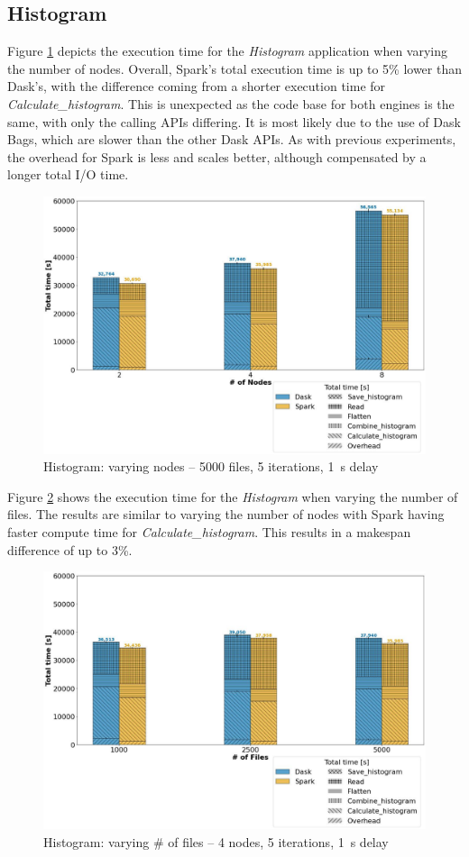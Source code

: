 \documentclass[AMA,STIX1COL]{WileyNJD-v2}
\begin{document}
\subsection{Histogram}
Figure \ref{fig:histogram_worker} depicts the execution time for the \textit{Histogram} application when varying the number of nodes.
Overall, Spark's total execution time is up to 5\% lower than Dask's, with the difference coming from a shorter execution time for \textit{Calculate\_histogram}.
This is unexpected as the code base for both engines is the same, with only the calling APIs differing.
It is most likely due to the use of Dask Bags, which are slower than the other Dask APIs.
As with previous experiments, the overhead for Spark is less and scales better, although compensated by a longer total I/O time.
\begin{figure}[!h]
	\centering
	\includegraphics[clip,width=0.75\columnwidth]{figures/stacked_histogram_worker.jpg}
	\caption{Histogram: varying nodes -- 5000 files, 5 iterations, \SI{1}{\second} delay}
	\label{fig:histogram_worker}
\end{figure}
				
Figure \ref{fig:histogram_block} shows the execution time for the \textit{Histogram} when varying the number of files.
The results are similar to varying the number of nodes with Spark having faster compute time for \textit{Calculate\_histogram}.
This results in a makespan difference of up to 3\%.
\begin{figure}[!h]
	\centering
	\includegraphics[clip,width=0.75\columnwidth]{figures/stacked_histogram_block.jpg}
	\caption{Histogram: varying \# of files -- 4 nodes, 5 iterations, \SI{1}{\second} delay}
	\label{fig:histogram_block}
\end{figure}
		
\end{document}
